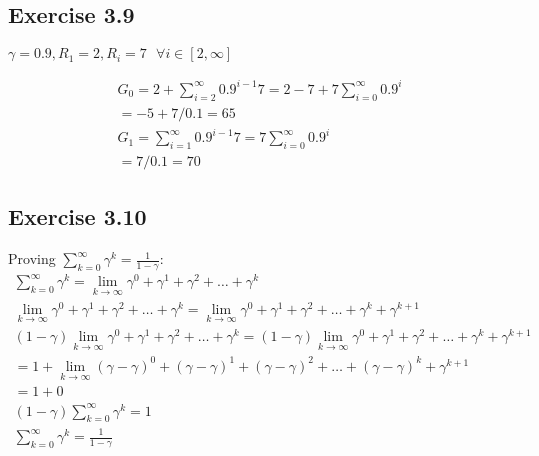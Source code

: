 \subsection{Exercise 3.9}
$\gamma = 0.9, R_1 = 2, R_i = 7 \text{ }\forall i \in [2,\infty]$

\begin{gather}
  G_0 = 2 + \sum_{i=2}^{\infty} 0.9^{i-1}7 = 2 - 7 + 7\sum_{i=0}^{\infty} 0.9^{i} \\
  = -5 + 7/0.1 = 65 \\
  G_1 = \sum_{i=1}^{\infty} 0.9^{i-1}7 = 7\sum_{i=0}^{\infty} 0.9^{i} \\
  = 7/0.1 = 70
\end{gather}

\subsection{Exercise 3.10}
Proving $\sum_{k=0}^{\infty}\gamma^k = \frac{1}{1-\gamma}$: 
\begin{gather}
  \sum_{k=0}^{\infty}\gamma^k = \lim_{k \to \infty}\gamma^0 + \gamma^1 + \gamma^2 + \dots + \gamma^k \\
  \lim_{k \to \infty}\gamma^0 + \gamma^1 + \gamma^2 + \dots + \gamma^k = \lim_{k \to \infty}\gamma^0 + \gamma^1 + \gamma^2 + \dots + \gamma^k + \gamma^{k+1} \\
  (1-\gamma)\lim_{k \to \infty}\gamma^0 + \gamma^1 + \gamma^2 + \dots + \gamma^k = (1-\gamma)\lim_{k \to \infty}\gamma^0 + \gamma^1 + \gamma^2 + \dots + \gamma^k + \gamma^{k+1} \\
  = 1+ \lim_{k \to \infty}(\gamma-\gamma)^0 + (\gamma-\gamma)^1 + (\gamma-\gamma)^2 + \dots + (\gamma-\gamma)^k + \gamma^{k+1} \\
  = 1 + 0 \\
  (1-\gamma)\sum_{k=0}^{\infty}\gamma^k = 1 \\
  \sum_{k=0}^{\infty}\gamma^k = \frac{1}{1-\gamma}
\end{gather}